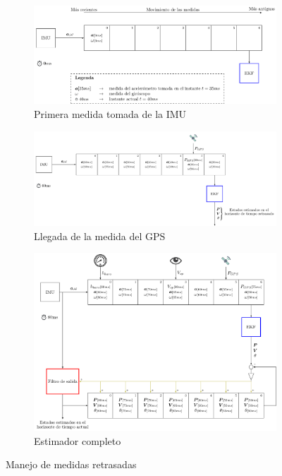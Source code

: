 \begin{figure}	
	\centering
	\begin{subfigure}[t]{0.9\textwidth}
		\centering
		\hspace*{-2.0cm}
		\includegraphics[width=\textwidth]{estimador_px4/tikz/ekf_output_1}
		\caption{Primera medida tomada de la IMU}\label{fig:est1}		
	\end{subfigure}
	\quad
	\begin{subfigure}[t]{1.05\textwidth}
		\centering
		\includegraphics[width=\textwidth]{estimador_px4/tikz/ekf_output_2}
		\caption{Llegada de la medida del GPS}\label{fig:est2}		
	\end{subfigure}
	\begin{subfigure}[t]{0.9\textwidth}
		\centering
		\vspace{1cm}
		\hspace*{-2cm}
		\includegraphics[width=\textwidth]{estimador_px4/tikz/ekf_output_3}
		\caption{Estimador completo}\label{fig:est3}		
	\end{subfigure}
	\quad
	\caption{Manejo de medidas retrasadas}\label{fig:retraso}
\end{figure}

